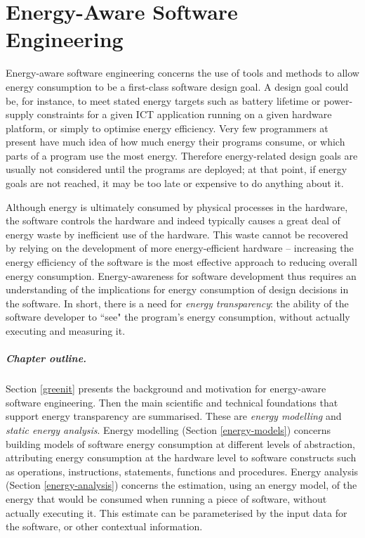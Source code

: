 \documentclass[oneside]{book}
\begin{document}
\chapter{Energy-Aware Software Engineering}

Energy-aware software engineering concerns the use of tools and methods to allow energy consumption to be a first-class software design goal. A design goal could be, for instance, to meet stated energy targets such as battery lifetime or power-supply constraints for a given ICT application running on a given hardware platform, or simply to optimise energy efficiency. Very few programmers at present have much idea of how much energy their programs consume, or which parts of a program use the most energy. Therefore energy-related design goals are usually not considered until the programs are deployed; at that point, if energy goals are not reached, it may be too late or expensive to do anything about it. 


Although energy is ultimately consumed by physical processes in the hardware, the software controls the hardware and indeed typically causes a great deal of energy waste by inefficient use of the hardware. This waste cannot be recovered by relying on the development of more energy-efficient hardware -- increasing the energy efficiency of the software is the most effective approach to reducing overall energy consumption.  Energy-awareness for software development thus requires an understanding of the implications for energy consumption of design decisions in the software. In short, there is a need for \emph{energy transparency}: the ability of the software developer to ``see" the program's energy consumption, without actually executing and measuring it. 

\paragraph{Chapter outline.}  Section \ref{greenit} presents the background and motivation for energy-aware software engineering. Then  the main scientific and technical foundations that support energy transparency are summarised.  These are \emph{energy modelling} and \emph{static energy analysis}. Energy modelling (Section \ref{energy-models}) concerns building models of software energy consumption at different levels of abstraction, attributing energy consumption at the hardware level to software constructs such as operations, instructions, statements, functions and
procedures.   Energy analysis (Section \ref{energy-analysis}) concerns the estimation, using an energy model, of the energy that would be consumed when running a piece of software, without actually executing it.  This estimate can be parameterised by the input data for the software, or other contextual information. 
\end{document}
